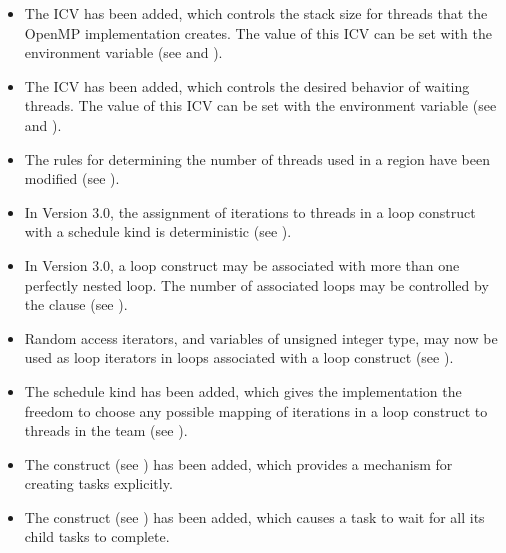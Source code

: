 \begin{itemize}
\item The  ICV has been added, which controls the stack size 
      for threads that the OpenMP implementation creates. The value of this ICV 
      can be set with the  environment variable 
      (see  and ).

\item The  ICV has been added, which controls the desired 
      behavior of waiting threads. The value of this ICV can be set with the 
       environment variable 
      (see  and ).

\item The rules for determining the number of threads used in a  
      region have been modified (see 
      ).

\item In Version 3.0, the assignment of iterations to threads in a loop construct 
      with a  schedule kind is deterministic (see 
      ).

\item In Version 3.0, a loop construct may be associated with more than one 
      perfectly nested loop. The number of associated loops may be controlled 
      by the  clause 
      (see ).

\item Random access iterators, and variables of unsigned integer type, may now 
      be used as loop iterators in loops associated with a loop construct 
      (see ).

\item The schedule kind  has been added, which gives the implementation 
      the freedom to choose any possible mapping of iterations in a loop construct 
      to threads in the team (see ).

\item The  construct (see ) has been
      added, which provides a mechanism for creating tasks explicitly.

\item The  construct (see ) 
      has been added, which causes a task to wait for all its child tasks to 
      complete.


\end{itemize}
